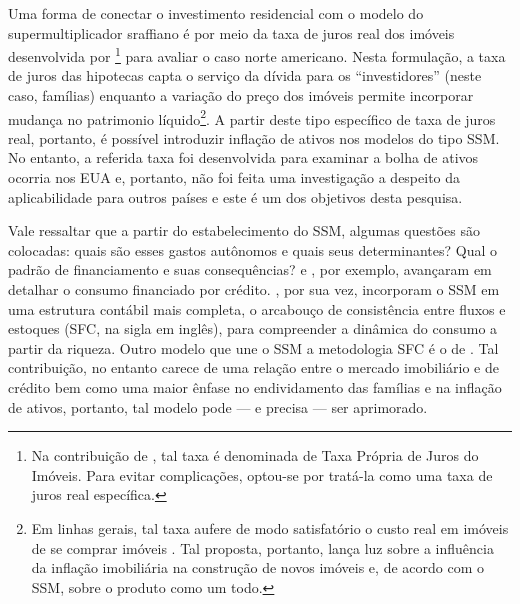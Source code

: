 Uma forma de conectar o investimento residencial com o modelo do supermultiplicador sraffiano é por meio da taxa de juros real dos imóveis desenvolvida por \textcite{teixeira_crescimento_2015}\footnote{Na contribuição de \textcite{teixeira_crescimento_2015}, tal taxa é denominada de Taxa Própria de Juros do Imóveis. Para evitar complicações, optou-se por tratá-la como uma taxa de juros real específica.} para avaliar o caso norte americano. Nesta formulação, a taxa de juros das hipotecas capta o serviço da dívida para os ``investidores'' (neste caso, famílias) enquanto a variação do preço dos imóveis permite incorporar mudança no patrimonio líquido\footnote{Em linhas gerais, tal taxa aufere de modo satisfatório o custo real em imóveis de se comprar imóveis \cite[p.~53]{teixeira_crescimento_2015}. Tal proposta, portanto, lança luz sobre a influência da inflação imobiliária na construção de novos imóveis e, de acordo com o SSM, sobre o produto como um todo.}. 
A partir deste tipo específico de taxa de juros real, portanto, é possível introduzir inflação de ativos nos modelos do tipo SSM. No entanto, a referida taxa foi desenvolvida para examinar a bolha de ativos ocorria nos EUA e, portanto, não foi feita uma investigação a despeito da aplicabilidade para outros países e este é um dos objetivos desta pesquisa.

	
Vale ressaltar que a partir do estabelecimento do SSM, algumas questões são colocadas: quais são esses gastos autônomos e quais seus determinantes? Qual o padrão de financiamento e suas consequências? \textcite{pariboni_household_2016} e \textcite{fagundes_dinamica_2017}, por exemplo, avançaram em detalhar o consumo financiado por crédito.  \textcite{brochier_supermultiplier_2018}, por sua vez, incorporam o SSM em uma estrutura contábil mais completa, o arcabouço de consistência entre fluxos e estoques (SFC, na sigla em inglês), para compreender a dinâmica do consumo a partir da riqueza. Outro modelo que une o SSM a metodologia SFC é o de \textcite{da_silveira_investimento_2019}. Tal contribuição, no entanto carece de uma relação entre o mercado imobiliário e de crédito bem como uma maior ênfase no endividamento das famílias e na inflação de ativos, portanto, tal modelo pode --- e precisa --- ser  aprimorado.


